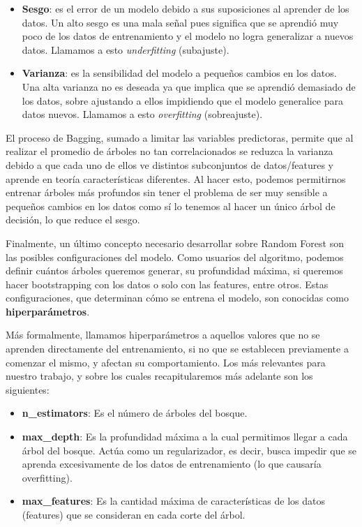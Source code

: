 \begin{itemize}
    \item \textbf{Sesgo}: es el error de un modelo debido a sus suposiciones al aprender de los datos. Un alto sesgo es una mala señal pues significa que se aprendió muy poco de los datos de entrenamiento y el modelo no logra generalizar a nuevos datos. Llamamos a esto \textit{underfitting} (subajuste).
    \item \textbf{Varianza}: es la sensibilidad del modelo a pequeños cambios en los datos. Una alta varianza no es deseada ya que implica que se aprendió demasiado de los datos, sobre ajustando a ellos impidiendo que el modelo generalice para datos nuevos. Llamamos a esto \textit{overfitting} (sobreajuste).
\end{itemize}

El proceso de Bagging, sumado a limitar las variables predictoras, permite que al realizar el promedio de árboles no tan correlacionados se reduzca la varianza debido a que cada uno de ellos ve distintos subconjuntos de datos/features y aprende en teoría características diferentes. Al hacer esto, podemos permitirnos entrenar árboles más profundos sin tener el problema de ser muy sensible a pequeños cambios en los datos como sí lo tenemos al hacer un único árbol de decisión, lo que reduce el sesgo.

Finalmente, un último concepto necesario desarrollar sobre Random Forest son las posibles configuraciones del modelo. Como usuarios del algoritmo, podemos definir cuántos árboles queremos generar, su profundidad máxima, si queremos hacer bootstrapping con los datos o solo con las features, entre otros. Estas configuraciones, que determinan cómo se entrena el modelo, son conocidas como \textbf{hiperparámetros}. 

Más formalmente, llamamos hiperparámetros a aquellos valores que no se aprenden directamente del entrenamiento, si no que se establecen previamente a comenzar el mismo, y afectan su comportamiento.
Los más relevantes para nuestro trabajo, y sobre los cuales recapitularemos más adelante son los siguientes:

\begin{itemize}
    \item \textbf{n\_estimators}: Es el número de árboles del bosque.
    \item \textbf{max\_depth}: Es la profundidad máxima a la cual permitimos llegar a cada árbol del bosque. Actúa como un regularizador, es decir, busca impedir que se aprenda excesivamente de los datos de entrenamiento (lo que causaría overfitting).
    \item \textbf{max\_features}: Es la cantidad máxima de características de los datos (features) que se consideran en cada corte del árbol.
\end{itemize}

